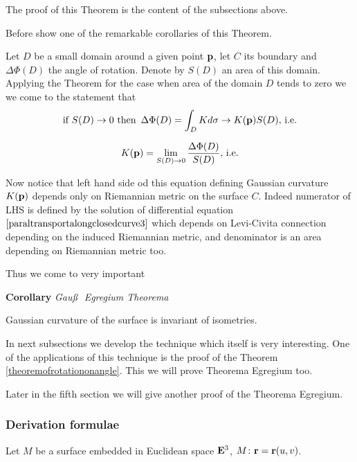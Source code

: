 \documentclass[12pt]{article}
\theoremstyle{theorem}
\numberwithin{equation}{section}
\begin{document}
The  proof of this Theorem is the content of the subsections above.

Before show one of the remarkable corollaries of this Theorem.

Let  $D$ be a small domain around  a given point ${\bf p}$, let $C$ its boundary and
$\Delta \Phi(D)$ the angle of rotation.   Denote by $S(D)$ an area of this domain.
Applying the Theorem for the case when area of the domain $D$ tends to zero we  we come to the statement that
            $$
      \hbox{if $S(D)\to 0$ then \,} \Delta\Phi(D)=\int_D Kd\sigma\to K({\bf p})S(D),\,{\rm i.e.}
            $$

\begin{equation}\label{egregium1}
K({\bf p})=\lim_{S(D)\to 0}{\Delta\Phi(D)\over S(D)},\,{\rm i.e.}
\end{equation}

Now notice that  left hand side od this equation defining Gaussian curvature $K({\bf p})$ depends only on Riemannian
metric on the surface $C$. Indeed numerator of LHS is defined by the solution of differential equation
$\eqref{paraltransportalongclosedcurve3}$ which depends on Levi-Civita connection depending on
the induced Riemannian metric, and denominator is an area depending on Riemannian metric too.

Thus we come to very important

{\bf Corollary} {\it Gau\ss \,\, Egregium Theorema}

Gaussian curvature of the surface is invariant of isometries.


\bigskip


In next subsections we develop the technique which  itself is very interesting. One of the applications of this
technique is the proof of the Theorem \eqref{theoremofrotationonangle}.
This we will prove Theorema Egregium too.

Later in the fifth section we will give another proof of the Theorema  Egregium.

\subsubsection{ Derivation formulae}

Let $M$ be a surface embedded in  Euclidean space ${\bf E}^3$,
$M\colon {\bf r}={\bf r}(u,v)$.
\end{document}
